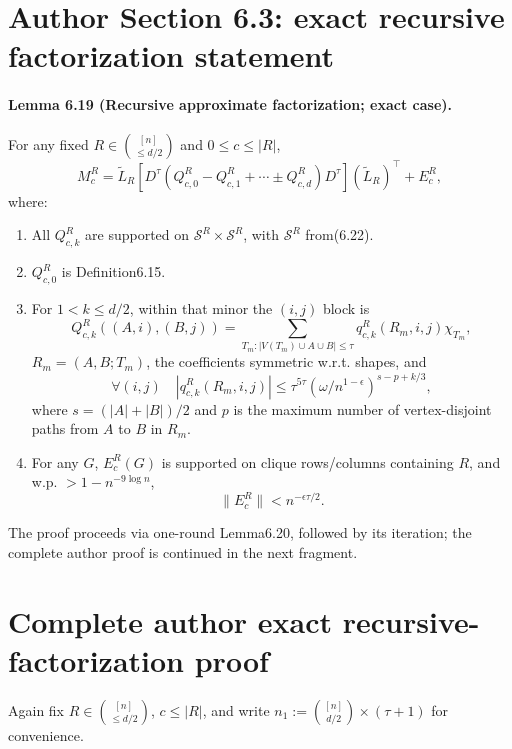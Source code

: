 \documentclass[10pt,a4paper]{article}
\begin{document}
\section*{Author Section 6.3: exact recursive factorization statement}
\paragraph{Lemma 6.19 (Recursive approximate factorization; exact case).} For any fixed $R\in\binom{[n]}{\le d/2}$ and $0\le c\le|R|$,
\[M_c^R=\widetilde L_R[D^\tau(Q_{c,0}^R-Q_{c,1}^R+\cdots\pm Q_{c,d}^R)D^\tau](\widetilde L_R)^\top+E_c^R,\tag{6.27}\]
where:
\begin{enumerate}\item All $Q_{c,k}^R$ are supported on $\mathcal S^R\times\mathcal S^R$, with $\mathcal S^R$ from(6.22).
\item $Q_{c,0}^R$ is Definition6.15.
\item For $1<k\le d/2$, within that minor the $(i,j)$ block is
\[Q_{c,k}^R((A,i),(B,j))=\sum_{T_m:|V(T_m)\cup A\cup B|\le\tau}q_{c,k}^R(R_m,i,j)\chi_{T_m},\tag{6.28}\]
$R_m=(A,B;T_m)$, the coefficients symmetric w.r.t. shapes, and
\[\forall(i,j)\quad|q_{c,k}^R(R_m,i,j)|\le\tau^{5\tau}(\omega/n^{1-\epsilon})^{s-p+k/3},\tag{6.29}\]
where $s=(|A|+|B|)/2$ and $p$ is the maximum number of vertex-disjoint paths from $A$ to $B$ in $R_m$.
\item For any $G$, $E_c^R(G)$ is supported on clique rows/columns containing $R$, and w.p. $>1-n^{-9\log n}$,
\[\|E_c^R\|<n^{-\epsilon\tau/2}.\tag{6.30}\]
\end{enumerate}
The proof proceeds via one-round Lemma6.20, followed by its iteration; the complete author proof is continued in the next fragment.

\section*{Complete author exact recursive-factorization proof}
Again fix $R\in\binom{[n]}{\le d/2}$, $c\le|R|$, and write $n_1:=\binom{[n]}{d/2}\times(\tau+1)$ for convenience.
\end{document}
